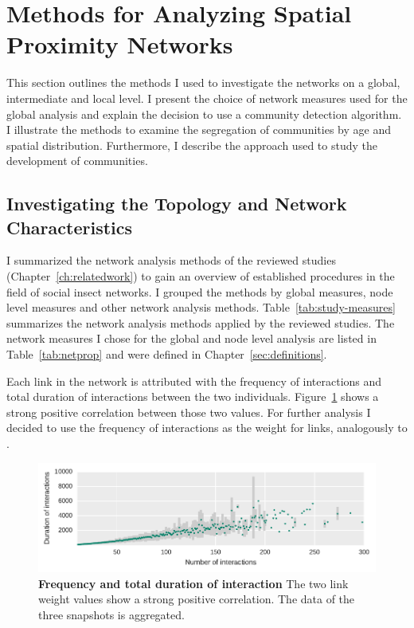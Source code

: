 \section{Methods for Analyzing Spatial Proximity Networks}
This section outlines the methods I used to investigate the networks on a global, intermediate and local level.
I present the choice of network measures used for the global analysis and explain the decision to use a community detection algorithm.
I illustrate the methods to examine the segregation of communities by age and spatial distribution.
Furthermore, I describe the approach used to study the development of communities.

\subsection{Investigating the Topology and Network Characteristics}
\label{subsec:APmeasures}
I summarized the network analysis methods of the reviewed studies (Chapter~\ref{ch:relatedwork}) to gain an overview of established procedures in the field of social insect networks.
I grouped the methods by global measures, node level measures and other network analysis methods.
Table~\ref{tab:study-measures} summarizes the network analysis methods applied by the reviewed studies.
The network measures I chose for the global and node level analysis are listed in Table~\ref{tab:netprop} and were defined in Chapter~\ref{sec:definitions}.

Each link in the network is attributed with the frequency of interactions and total duration of interactions between the two individuals. Figure~\ref{fig:fVSd} shows a strong positive correlation between those two values.
For further analysis I decided to use the frequency of interactions as the weight for links, analogously to \cite{mersch2013tracking,baracchi2014socio}.


\begin{figure}[tb]
	\centering
	\includegraphics[width=1.0\textwidth]{Figures/n3-freqVSduration}
	\caption[Frequency and total duration of interaction]{\textbf{Frequency and total duration of interaction} The two link weight values show a strong positive correlation. The data of the three snapshots is aggregated.}
	\label{fig:fVSd}
\end{figure}

